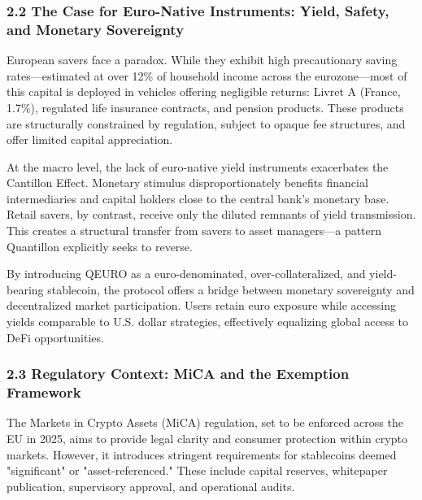 \hypertarget{the-case-for-euro-native-instruments-yield-safety-and-monetary-sovereignty}{%
\subsubsection{2.2 The Case for Euro-Native Instruments: Yield, Safety,
and Monetary
Sovereignty}\label{the-case-for-euro-native-instruments-yield-safety-and-monetary-sovereignty}}

European savers face a paradox. While they exhibit high precautionary
saving rates---estimated at over 12\% of household income across the
eurozone---most of this capital is deployed in vehicles offering
negligible returns: Livret A (France, 1.7\%), regulated life insurance
contracts, and pension products. These products are structurally
constrained by regulation, subject to opaque fee structures, and offer
limited capital appreciation.

At the macro level, the lack of euro-native yield instruments
exacerbates the Cantillon Effect. Monetary stimulus disproportionately
benefits financial intermediaries and capital holders close to the
central bank's monetary base. Retail savers, by contrast, receive only
the diluted remnants of yield transmission. This creates a structural
transfer from savers to asset managers---a pattern Quantillon explicitly
seeks to reverse.

By introducing QEURO as a euro-denominated, over-collateralized, and
yield-bearing stablecoin, the protocol offers a bridge between monetary
sovereignty and decentralized market participation. Users retain euro
exposure while accessing yields comparable to U.S. dollar strategies,
effectively equalizing global access to DeFi opportunities.

\hypertarget{regulatory-context-mica-and-the-exemption-framework}{%
\subsubsection{2.3 Regulatory Context: MiCA and the Exemption
Framework}\label{regulatory-context-mica-and-the-exemption-framework}}

The Markets in Crypto Assets (MiCA) regulation, set to be enforced
across the EU in 2025, aims to provide legal clarity and consumer
protection within crypto markets. However, it introduces stringent
requirements for stablecoins deemed "significant" or "asset-referenced."
These include capital reserves, whitepaper publication, supervisory
approval, and operational audits.

